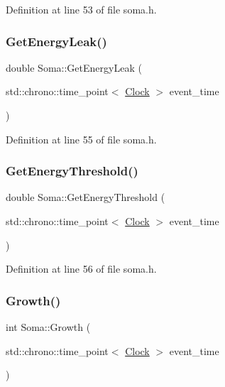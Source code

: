 Definition at line 53 of file soma.\+h.

\mbox{\label{class_soma_a0be69cd912f978f3ab3d94bebb9fbbaf}} 
\subsubsection{\texorpdfstring{Get\+Energy\+Leak()}{GetEnergyLeak()}}
{\footnotesize\ttfamily double Soma\+::\+Get\+Energy\+Leak (\begin{DoxyParamCaption}\item[{std\+::chrono\+::time\+\_\+point$<$ \hyperlink{universe_8h_a0ef8d951d1ca5ab3cfaf7ab4c7a6fd80}{Clock} $>$}]{event\+\_\+time }\end{DoxyParamCaption})\hspace{0.3cm}{\ttfamily [inline]}}



Definition at line 55 of file soma.\+h.

\mbox{\label{class_soma_a0b45cc454565027bb25daa1396056a7e}} 
\subsubsection{\texorpdfstring{Get\+Energy\+Threshold()}{GetEnergyThreshold()}}
{\footnotesize\ttfamily double Soma\+::\+Get\+Energy\+Threshold (\begin{DoxyParamCaption}\item[{std\+::chrono\+::time\+\_\+point$<$ \hyperlink{universe_8h_a0ef8d951d1ca5ab3cfaf7ab4c7a6fd80}{Clock} $>$}]{event\+\_\+time }\end{DoxyParamCaption})\hspace{0.3cm}{\ttfamily [inline]}}



Definition at line 56 of file soma.\+h.

\mbox{\label{class_soma_aa6162ca8a98a14cf49ba8310db129d47}} 
\subsubsection{\texorpdfstring{Growth()}{Growth()}}
{\footnotesize\ttfamily int Soma\+::\+Growth (\begin{DoxyParamCaption}\item[{std\+::chrono\+::time\+\_\+point$<$ \hyperlink{universe_8h_a0ef8d951d1ca5ab3cfaf7ab4c7a6fd80}{Clock} $>$}]{event\+\_\+time }\end{DoxyParamCaption})}



